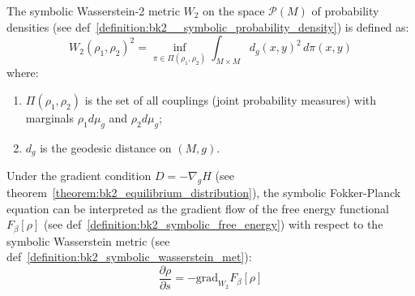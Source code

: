 \begin{definition} 
\label{definition:bk2_symbolic_wasserstein_met} 
The symbolic Wasserstein-2 metric $W_2$ on the space $\mathcal{P}(M)$ of probability densities (see def~\ref{definition:bk2__symbolic_probability_density}) is defined as:
\[
W_2(\rho_1, \rho_2)^2 = \inf_{\pi \in \Pi(\rho_1, \rho_2)} \int_{M \times M} d_g(x,y)^2 \, d\pi(x,y)
\]
where:
\begin{enumerate}
    \item $\Pi(\rho_1, \rho_2)$ is the set of all couplings (joint probability measures) with marginals $\rho_1 d\mu_g$ and $\rho_2 d\mu_g$;
    \item $d_g$ is the geodesic distance on $(M,g)$.
\end{enumerate}
\end{definition}

\begin{theorem} 
\label{theorem:bk2_wasserstein_gradient_flow} 
Under the gradient condition $D = -\nabla_g H$ (see theorem~\ref{theorem:bk2_equilibrium_distribution}), the symbolic Fokker-Planck equation can be interpreted as the gradient flow of the free energy functional $F_\beta[\rho]$ (see def~\ref{definition:bk2_symbolic_free_energy}) with respect to the symbolic Wasserstein metric (see def~\ref{definition:bk2_symbolic_wasserstein_met}):
\[
\frac{\partial \rho}{\partial s} = -\text{grad}_{W_2} F_\beta[\rho]
\]
\end{theorem}

